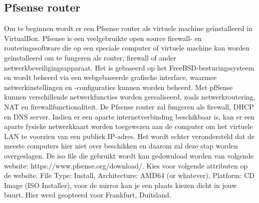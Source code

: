 \subsection{Pfsense router}
Om te beginnen wordt er een Pfsense router als virtuele machine geïnstalleerd in VirtualBox. Pfsense is een veelgebruikte open source firewall- en routeringssoftware die op een speciale computer of virtuele machine kan worden geïnstalleerd om te fungeren als router, firewall of ander netwerkbeveiligingsapparaat. Het is gebaseerd op het FreeBSD-besturingssysteem en wordt beheerd via een webgebaseerde grafische interface, waarmee netwerkinstellingen en -configuraties kunnen worden beheerd. Met pfSense kunnen verschillende netwerkfuncties worden gerealiseerd, zoals netwerkroutering, NAT en firewallfunctionaliteit.
De Pfsense router zal fungeren als firewall, DHCP en DNS server. Indien er een aparte internetverbinding beschikbaar is, kan er een aparte fysieke netwerkkaart worden toegewezen aan de computer om het virtuele LAN te voorzien van een publiek IP-adres. Het wordt echter verondersteld dat de meeste computers hier niet over beschikken en daarom zal deze stap worden overgeslagen.
De iso file die gebruikt wordt kan gedownload worden van volgende website: https://www.pfsense.org/download/.  Kies voor volgende attributen op de website. File Type: Install, Architecture: AMD64 (or whatever), Platform: CD Image (ISO Installer), voor de mirror kan je een plaats kiezen dicht in jouw buurt. Hier werd geopteerd voor Frankfurt, Duitsland. 

